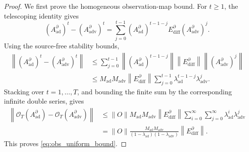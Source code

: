\begin{proof}
We first prove the homogeneous observation-map bound. For \(t\ge 1\),
the telescoping identity gives
\[
(A_{\mathrm{ad}}^{\partial})^t
-
(A_{\mathrm{adv}}^{\partial})^t
=
\sum_{j=0}^{t-1}
(A_{\mathrm{ad}}^{\partial})^{t-1-j}
E_{\mathrm{diff}}^{\partial}
(A_{\mathrm{adv}}^{\partial})^j .
\]
Using the source-free stability bounds,
\begin{align}
\left\|
(A_{\mathrm{ad}}^{\partial})^t
-
(A_{\mathrm{adv}}^{\partial})^t
\right\|
&\le
\sum_{j=0}^{t-1}
\left\|
(A_{\mathrm{ad}}^{\partial})^{t-1-j}
\right\|
\left\|
E_{\mathrm{diff}}^{\partial}
\right\|
\left\|
(A_{\mathrm{adv}}^{\partial})^j
\right\| \nonumber \\
&\le
M_{\mathrm{ad}}M_{\mathrm{adv}}
\left\|
E_{\mathrm{diff}}^{\partial}
\right\|
\sum_{j=0}^{t-1}
\lambda_{\mathrm{ad}}^{t-1-j}
\lambda_{\mathrm{adv}}^j .
\end{align}
Stacking over \(t=1,\ldots,T\), and bounding the finite sum by the
corresponding infinite double series, gives
\begin{align}
\left\|
\mathcal O_T(A_{\mathrm{ad}}^{\partial})
-
\mathcal O_T(A_{\mathrm{adv}}^{\partial})
\right\|
&\le
\|O\|
M_{\mathrm{ad}}M_{\mathrm{adv}}
\left\|
E_{\mathrm{diff}}^{\partial}
\right\|
\sum_{i=0}^{\infty}
\sum_{j=0}^{\infty}
\lambda_{\mathrm{ad}}^i
\lambda_{\mathrm{adv}}^j \nonumber \\
&=
\|O\|
\frac{
M_{\mathrm{ad}}M_{\mathrm{adv}}
}{
(1-\lambda_{\mathrm{ad}})(1-\lambda_{\mathrm{adv}})
}
\left\|
E_{\mathrm{diff}}^{\partial}
\right\|.
\end{align}
This proves \eqref{eq:obs_uniform_bound}.


\end{proof}
